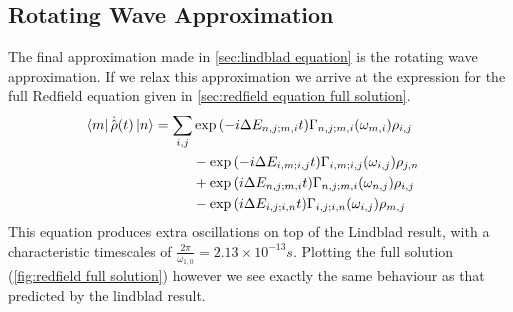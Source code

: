 \subsection{Rotating Wave Approximation}
The final approximation made in
\cref{sec:lindblad equation}
is the rotating wave approximation.
If we relax this approximation
we arrive at the expression
for the full Redfield equation given in
\cref{sec:redfield equation full solution}.
\begin{align}
    \bra{m}\dot{\hat{\rho{}}}(t) \ket{n} & = \begin{aligned}[t]
        \sum_{i,j} &
        \exp{(-i\Delta{}E_{n,j;m,i} t)}
        \Gamma_{n,j;m, i}(\omega_{m,i})
        \rho_{i,j}   \\
                   &
        -\exp{(-i\Delta{}E_{i,m;i,j} t)}
        \Gamma_{i,m;i, j}(\omega_{i,j})
        \rho_{j, n}  \\
                   &
        +\exp{(i\Delta{}E_{n,j;m,i} t)}
        \Gamma_{n,j; m, i}(\omega_{n,j})
        \rho_{i, j}  \\
                   &
        -\exp{(i\Delta{}E_{i,j;i,n} t)}
        \Gamma_{i,j; i, n}(\omega_{i,j})
        \rho_{m, j}
    \end{aligned}
\end{align}
This equation produces extra oscillations
on top of the Lindblad result, with
a characteristic timescales of
\(\frac{2\pi}{\omega_{1,0}} = 2.13\times{}10^{-13}s\). Plotting
the full solution (\cref{fig:redfield full solution})
however we see exactly the same behaviour as that
predicted by the lindblad result.
